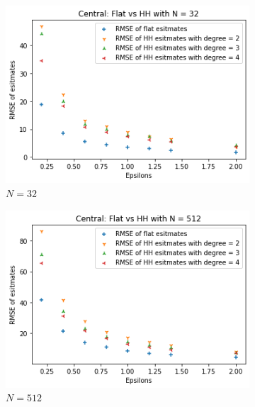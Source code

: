 \documentclass[11pt]{article}
\theoremstyle{definition}
\begin{document}
\begin{figure}[H]
\centering
\begin{subfigure}{.3\textwidth}
  \centering
  \includegraphics[width=\linewidth]{figures/central_flat_hh/flat_beat_hh_N=32.png}
  \caption{$N=32$}
  \label{fig:cen_flat_hh1}
\end{subfigure}%
\begin{subfigure}{.3\textwidth}
  \centering
  \includegraphics[width=\linewidth]{figures/central_flat_hh/flat_beat_hh_N=512.png}
  \caption{$N=512$}
  \label{fig:cen_flat_hh2}
\end{subfigure}%
\begin{subfigure}{.3\textwidth}
  \centering

\end{subfigure}
\end{figure}
\end{document}
